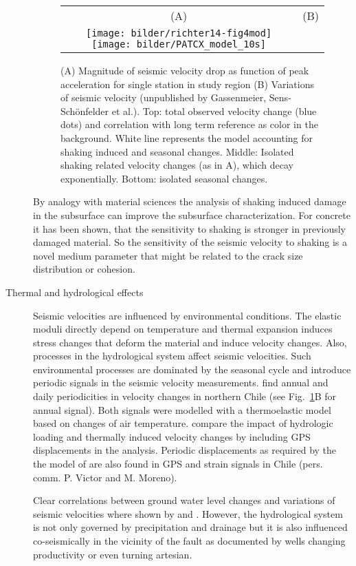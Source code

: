 \documentclass[11pt]{article}
\begin{document}
\begin{description}
\begin{figure}
\begin{tabular}{cc}
(A) & (B) \\ 
\texttt{[image: bilder/richter14-fig4mod]} \texttt{[image: bilder/PATCX\_model\_10s]} 
\end{tabular}
\caption{\footnotesize (A) Magnitude of seismic velocity drop as function of peak acceleration for single station in study region 
\citep{Richter2014}
(B) Variations of seismic velocity  (unpublished by Gassenmeier, Sens-Schönfelder et al.). Top: total observed velocity change (blue dots) and correlation with long term reference as color in the background. White line represents the model accounting for shaking induced and seasonal changes. Middle: Isolated shaking related velocity changes (as in A), which decay exponentially. Bottom: isolated seasonal changes. }
\label{fig:PATCX}
\end{figure}

By analogy with material sciences the analysis of shaking induced damage in the subsurface can  improve the subsurface characterization. For concrete it has been shown, that the sensitivity  to shaking is stronger in previously damaged material\citep{Tremblay2010}. So the sensitivity of the seismic velocity to shaking is a novel medium parameter that might be related to the crack size distribution or cohesion.%

 
 \item[Thermal and hydrological effects]
Seismic velocities are influenced by environmental conditions. The elastic moduli directly depend on temperature and thermal expansion induces stress changes that deform the material and induce velocity changes. Also, processes in the hydrological system affect seismic velocities. Such environmental processes are dominated by the seasonal cycle and introduce periodic signals in the seismic velocity measurements. \citet{Richter2014} find annual and daily periodicities in velocity changes in northern Chile (see Fig.~\ref{fig:PATCX}B for annual signal). Both signals were modelled with a thermoelastic model based on changes of air temperature. \citet{tsai_JGR_11} compare the impact  of hydrologic loading and thermally induced velocity changes by including GPS displacements in the analysis. Periodic displacements as required by the the model of \citet{Richter2014} are also found in GPS and strain signals in Chile (pers. comm. P. Victor and M. Moreno).

Clear correlations between ground water level changes and variations of seismic velocities where shown by \citet{sens-schoenfelder_wegler_GRL_06} and \citet{Gassenmeier2014}. However, the hydrological system is not only governed by precipitation and drainage but it is also influenced co-seismically in the vicinity of the fault \citep{Jonsson2003} as documented by wells changing productivity or even turning artesian. 
\end{description}
\end{document}

